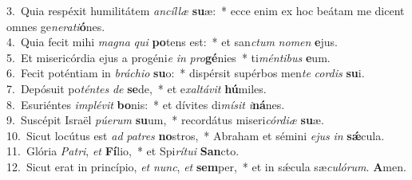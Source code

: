 {3.~}Quia respéxit humilitátem \textit{an}\textit{cíl}\textit{læ} \textbf{su}æ:~* ecce enim ex hoc beátam me dicent omnes ge\textit{ne}\textit{ra}\textit{ti}\textbf{ó}nes.\\
{4.~}Quia fecit mihi \textit{ma}\textit{gna} \textit{qui} \textbf{po}tens est:~* et san\textit{ctum} \textit{no}\textit{men} \textbf{e}jus.\\
{5.~}Et misericórdia ejus a progéni\textit{e} \textit{in} \textit{pro}\textbf{gé}nies~* ti\textit{mén}\textit{ti}\textit{bus} \textbf{e}um.\\
{6.~}Fecit poténtiam in \textit{brá}\textit{chi}\textit{o} \textbf{su}o:~* dispérsit supérbos men\textit{te} \textit{cor}\textit{dis} \textbf{su}i.\\
{7.~}Depósuit po\textit{tén}\textit{tes} \textit{de} \textbf{se}de,~* et e\textit{xal}\textit{tá}\textit{vit} \textbf{hú}miles.\\
{8.~}Esuriéntes \textit{im}\textit{plé}\textit{vit} \textbf{bo}nis:~* et dívites di\textit{mí}\textit{sit} \textit{i}\textbf{ná}nes.\\
{9.~}Suscépit Israël \textit{pú}\textit{e}\textit{rum} \textbf{su}um,~* recordátus miseri\textit{cór}\textit{di}\textit{æ} \textbf{su}æ.\\
{10.~}Sicut locútus est \textit{ad} \textit{pa}\textit{tres} \textbf{no}stros,~* Abraham et sémini \textit{e}\textit{jus} \textit{in} \textbf{sǽ}cula.\\
{11.~}Glória \textit{Pa}\textit{tri}, \textit{et} \textbf{Fí}lio,~* et Spi\textit{rí}\textit{tu}\textit{i} \textbf{San}cto.\\
{12.~}Sicut erat in princípio, \textit{et} \textit{nunc}, \textit{et} \textbf{sem}per,~* et in sǽcula sæ\textit{cu}\textit{ló}\textit{rum}. \textbf{A}men.\\
